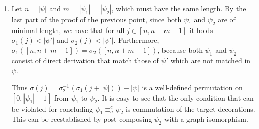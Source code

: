 \documentclass[conference]{IEEEtran}
\renewenvironment{proof}{\begin{IEEEproof}}{\end{IEEEproof}}
\newcommand{\interval}[2][1]{\ensuremath{[{#1},{#2}]}}
\newcommand{\perm}{\sigma}
\newcommand{\target}[1]{\ensuremath{\mathsf{t}({#1})}}
\begin{document}
\begin{proof}
\begin{enumerate}
  
\item 
%
%
%
%
%
  Let $n = |\psi|$ and $m = |\psi_1| = |\psi_2|$, which must have the same length.
  By the last part of the proof of the previous point,
  since 
  both $\psi_1$ and $\psi_2$ are of 
  minimal length, we have that for all $j \in
  \interval[n]{n+m-1}$ it holds  $\perm_1(j) < |\psi'|$ and $\perm_2(j) < |\psi'|$.
%
Furthermore, $\perm_1(\interval[n]{n+m-1}) = \perm_2(\interval[n]{n+m-1})$, 
because both $\psi_1$ and  $\psi_2$ consist of direct derivation that match 
those of $\psi'$ which are not matched in $\psi$.

Thus 
$\perm(j) = \perm_2^{-1}(\perm_1(j + |\psi|))-|\psi|$ is a
well-defined permutation on $\interval[0]{|\psi_1|-1}$ from $\psi_1$
to $\psi_2$. It is easy to see that the only condition that can be
violated for concluding $\psi_1 \equiv^c_\sigma \psi_2$ is commutation
of the target decorations. This can be reestablished by post-composing
$\psi_2$ with a graph isomorphism.
\end{enumerate}
\end{proof}
\end{document}
